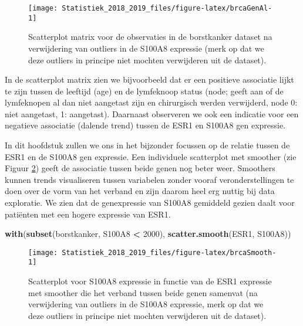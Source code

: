 \documentclass[12pt,dutch,coursenotes]{book}
\newenvironment{Shaded}{\begin{snugshade}}{\end{snugshade}}
\newcommand{\KeywordTok}[1]{\textcolor[rgb]{0.13,0.29,0.53}{\textbf{#1}}}
\newcommand{\DecValTok}[1]{\textcolor[rgb]{0.00,0.00,0.81}{#1}}
\newcommand{\StringTok}[1]{\textcolor[rgb]{0.31,0.60,0.02}{#1}}
\newcommand{\OperatorTok}[1]{\textcolor[rgb]{0.81,0.36,0.00}{\textbf{#1}}}
\newcommand{\NormalTok}[1]{#1}
\theoremstyle{definition}
\theoremstyle{definition}
\theoremstyle{definition}
\theoremstyle{remark}
\begin{document}
\begin{figure}

{\centering \texttt{[image: Statistiek\_2018\_2019\_files/figure-latex/brcaGenAl-1]} 

}

\caption{Scatterplot matrix voor de observaties in de borstkanker dataset na verwijdering van outliers in de S100A8 expressie (merk op dat we deze outliers in principe niet mochten verwijderen uit de dataset).}\label{fig:brcaGenAl}
\end{figure}

In de scatterplot matrix zien we bijvoorbeeld dat er een positieve
associatie lijkt te zijn tussen de leeftijd (age) en de lymfeknoop
status (node; geeft aan of de lymfeknopen al dan niet aangetast zijn en
chirurgisch werden verwijderd, node 0: niet aangetast, 1: aangetast).
Daarnaast observeren we ook een indicatie voor een negatieve associatie
(dalende trend) tussen de ESR1 en S100A8 gen expressie.

In dit hoofdstuk zullen we ons in het bijzonder focussen op de relatie
tussen de ESR1 en de S100A8 gen expressie. Een individuele scatterplot
met smoother (zie Figuur \ref{fig:brcaSmooth}) geeft de associatie
tussen beide genen nog beter weer. Smoothers kunnen trends visualiseren
tussen variabelen zonder vooraf veronderstellingen te doen over de vorm
van het verband en zijn daarom heel erg nuttig bij data exploratie. We
zien dat de genexpressie van S100A8 gemiddeld gezien daalt voor
patiënten met een hogere expressie van ESR1.

\begin{Shaded}
\begin{Highlighting}[]
\KeywordTok{with}\NormalTok{(}\KeywordTok{subset}\NormalTok{(borstkanker, S100A8 }\OperatorTok{<}\StringTok{ }\DecValTok{2000}\NormalTok{), }\KeywordTok{scatter.smooth}\NormalTok{(ESR1, }
\NormalTok{    S100A8))}
\end{Highlighting}
\end{Shaded}

\begin{figure}

{\centering \texttt{[image: Statistiek\_2018\_2019\_files/figure-latex/brcaSmooth-1]} 

}

\caption{Scatterplot voor S100A8 expressie in functie van de ESR1 expressie met smoother die het verband tussen beide genen samenvat (na verwijdering van outliers in de S100A8 expressie, merk op dat we deze outliers in principe niet mochten verwijderen uit de dataset).}\label{fig:brcaSmooth}
\end{figure}
\end{document}

